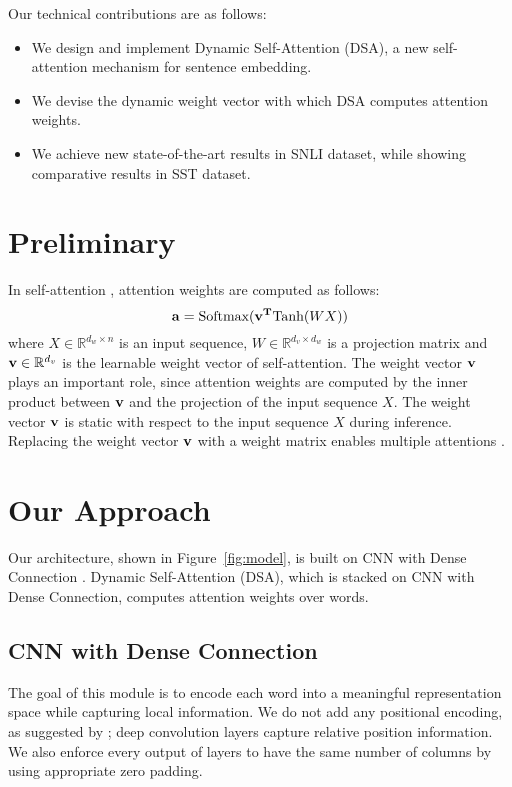 \documentclass[11pt,a4paper]{article}
\begin{document}
Our technical contributions are as follows:
\noindent\begin{itemize}[parsep=0pt,labelsep=*,leftmargin=1pc]
\item We design and implement Dynamic Self-Attention (DSA), a new self-attention mechanism for sentence embedding.
\item We devise the dynamic weight vector with which DSA computes attention weights.
\item We achieve new state-of-the-art results in SNLI dataset, while showing comparative results in SST dataset. 

\end{itemize}


\section{Preliminary}\label{back}
In self-attention \cite{Yang,hierarchical}, attention weights are computed as follows:
\begin{equation}
{\bf a} = \text{Softmax}({\bf v^T}\text{Tanh}(WX))\label{eq1}
\end{equation}
where $X\in \mathbb{R}^{d_w \times n}$ is an input sequence, $W\in \mathbb{R}^{d_v \times d_w}$ is a projection matrix and ${\bf v}\in \mathbb{R}^{d_v}$ is the learnable weight vector of self-attention. The weight vector ${\bf v}$ plays an important role, since attention weights are computed by the inner product between $\bf v$ and the projection of the input sequence $X$. The weight vector ${\bf v}$ is static with respect to the input sequence $X$ during inference. Replacing the weight vector $\bf v$ with a weight matrix enables multiple attentions \cite{self-attentive,disan}.  

\section{Our Approach}\label{ourapproach}
Our architecture, shown in Figure~\ref{fig:model}, is built on CNN with Dense Connection \cite{dense}. Dynamic Self-Attention (DSA), which is stacked on CNN with Dense Connection, computes attention weights over words.


\subsection{CNN with Dense Connection}\label{module1}
The goal of this module is to encode each word into a meaningful representation space while capturing local information. We do not add any positional encoding, as suggested by \citet{convseq2seq}; deep convolution layers capture relative position information. We also enforce every output of layers to have the same number of columns by using appropriate zero padding.
\end{document}
